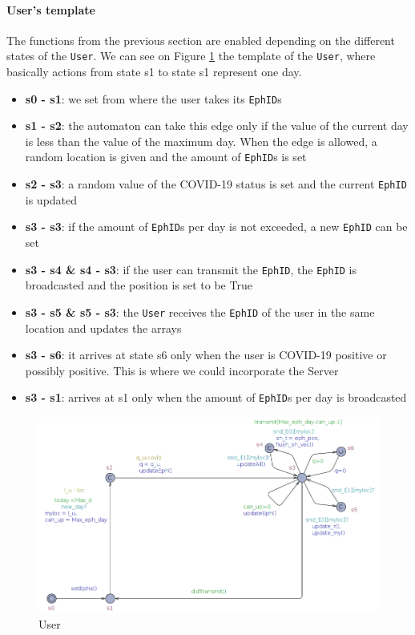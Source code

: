\documentclass[a4paper, twocolumn]{article}
\begin{document}
\paragraph{User's template}
The functions from the previous section are enabled depending on the different states of the \texttt{User}. We can see on Figure \ref{fig:user} the template of the \texttt{User}, where basically actions from state s1 to state s1 represent one day.
\begin{itemize}
    \item \textbf{s0 - s1}: we set from where the user takes its \texttt{EphID}s
    \item \textbf{s1 - s2}: the automaton can take this edge only if the value of the current day is less than the value of the maximum day. When the edge is allowed, a random location is given and the amount of \texttt{EphID}s is set
    \item \textbf{s2 - s3}: a random value of the COVID-19 status is set and the current \texttt{EphID} is updated
    \item \textbf{s3 - s3}: if the amount of \texttt{EphID}s per day is not exceeded, a new \texttt{EphID} can be set
    \item \textbf{s3 - s4 \& s4 - s3}: if the user can transmit the \texttt{EphID}, the \texttt{EphID} is broadcasted and the position is set to be True
    \item \textbf{s3 - s5 \& s5 - s3}: the \texttt{User} receives the \texttt{EphID} of the user in the same location and updates the arrays
    \item \textbf{s3 - s6}: it arrives at state s6 only when the user is COVID-19 positive or possibly positive. This is where we could incorporate the Server
    \item \textbf{s3 - s1}: arrives at s1 only when the amount of \texttt{EphID}s per day is broadcasted
\end{itemize}
\begin{figure}[H]
    \centering
    \includegraphics[scale=0.25]{images/user.png}
    \caption{User}
    \label{fig:user} 
\end{figure}
\end{document}
